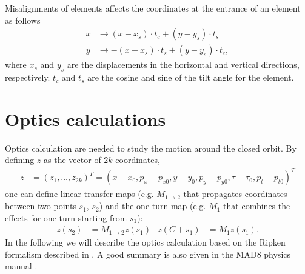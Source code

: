 \documentclass[english]{article}
\begin{document}
Misalignments of elements affects the coordinates at the entrance of an
element as follows
\begin{align}
    x &\to (x-x_s)\cdot t_c + (y-y_s)\cdot t_s \\
    y &\to -(x-x_s)\cdot t_s + (y-y_s)\cdot t_c,
\end{align}
where $x_s$ and $y_s$ are the displacements in the horizontal and vertical
directions, respectively. $t_c$ and $t_s$ are the cosine and sine of the tilt
angle for the element.

\section{Optics calculations}
\label{opt}
Optics calculation are needed to study the motion around the closed orbit. By defining $z$ as the vector of $2 k$ coordinates,  
\begin{align}\label{opt:eqn:1}
z&=(z_1,\ldots,z_{2k})^T=(x-x_0,p_x-p_{x0},y-y_0,p_y-p_{y0},\tau-\tau_0,p_t-p_{t0})^T
\end{align}
one can define linear transfer maps (e.g. $M_{1\to 2}$ that propagates coordinates between two points $s_1$, $s_2$) and the one-turn map (e.g. $M_1$ that combines the effects for one turn starting from $s_1$):
\begin{align}\label{opt:eqn:2}
z(s_2)&= M_{1\to 2} z(s_1) & z(C+s_1) &= M_1 z(s_1).
\end{align}
In the following we will describe the optics calculation based on the Ripken formalism described in \cite{willeke88}. A good summary is also given in the MAD8 physics manual \cite{mad8phys}.
\end{document}
